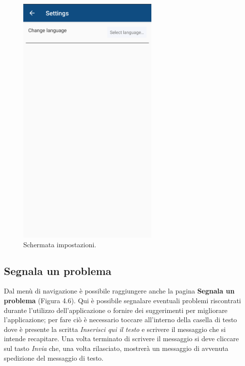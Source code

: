 \documentclass[a4paper,11pt,twoside,openright]{report}
\begin{document}
\begin{figure}[h]
\centering
\includegraphics[width=\linewidth,height=360pt,keepaspectratio]{images/Settings.png}
\caption{Schermata impostazioni.}
\end{figure}

\subsection{Segnala un problema}
Dal menù di navigazione è possibile raggiungere anche la pagina \textbf{Segnala un problema} (Figura 4.6). Qui è possibile segnalare eventuali problemi riscontrati durante l'utilizzo dell'applicazione
o fornire dei suggerimenti per migliorare l'applicazione; per fare ciò è necessario toccare all'interno della casella di testo dove è presente la scritta \textit{Inserisci qui il testo} e scrivere
il messaggio che si intende recapitare. Una volta terminato di scrivere il messaggio si deve cliccare sul tasto \textit{Invia} che, una volta rilasciato, mostrerà un messaggio di avvenuta spedizione del messaggio di testo.
\end{document}
